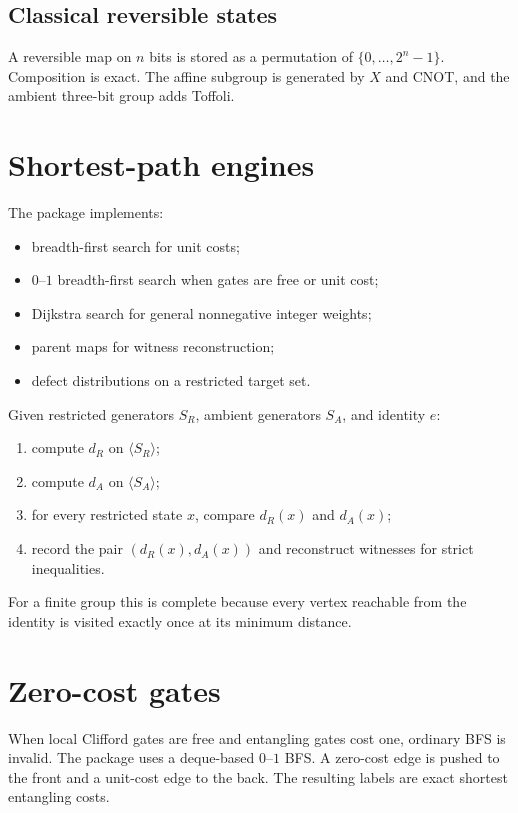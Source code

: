 \subsection{Classical reversible states}
A reversible map on $n$ bits is stored as a permutation of $\{0,\ldots,2^n-1\}$.  Composition is exact.  The affine subgroup is generated by $X$ and CNOT, and the ambient three-bit group adds Toffoli.

\section{Shortest-path engines}
The package implements:
\begin{itemize}
\item breadth-first search for unit costs;
\item $0$--$1$ breadth-first search when gates are free or unit cost;
\item Dijkstra search for general nonnegative integer weights;
\item parent maps for witness reconstruction;
\item defect distributions on a restricted target set.
\end{itemize}

\begin{algorithm}
Given restricted generators $S_R$, ambient generators $S_A$, and identity $e$:
\begin{enumerate}
\item compute $d_R$ on $\langle S_R\rangle$;
\item compute $d_A$ on $\langle S_A\rangle$;
\item for every restricted state $x$, compare $d_R(x)$ and $d_A(x)$;
\item record the pair $(d_R(x),d_A(x))$ and reconstruct witnesses for strict inequalities.
\end{enumerate}
\end{algorithm}

For a finite group this is complete because every vertex reachable from the identity is visited exactly once at its minimum distance.

\section{Zero-cost gates}
When local Clifford gates are free and entangling gates cost one, ordinary BFS is invalid.  The package uses a deque-based $0$--$1$ BFS.  A zero-cost edge is pushed to the front and a unit-cost edge to the back.  The resulting labels are exact shortest entangling costs.

